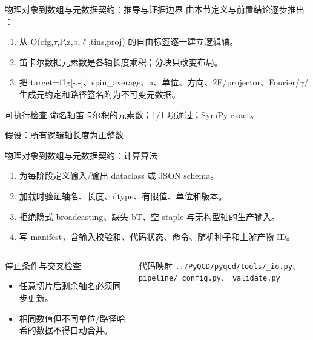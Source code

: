 \begin{frame}[t]{物理对象到数组与元数据契约：推导与证据边界}
\footnotesize
{}\quad 由本节定义与前置结论逐步推出 ：
\begin{enumerate}
\item 从 O(cfg,\ensuremath{\tau},P,z,b,\ensuremath{\ell},tins,proj) 的自由标签逐一建立逻辑轴。
\item 笛卡尔数据元素数是各轴长度乘积；分块只改变布局。
\item 把 target=f1g[-,-]、spin\_average、a、单位、方向、2E/\allowbreak{}projector、Fourier/\allowbreak{}\ensuremath{\gamma}/\allowbreak{}生成元约定和路径签名附为不可变元数据。
\end{enumerate}\begin{block}{可执行检查}
\quad 命名轴笛卡尔积的元素数；1/1 项通过；SymPy exact。
\par\scriptsize 假设：所有逻辑轴长度为正整数
\end{block}
\end{frame}

\begin{frame}[t]{物理对象到数组与元数据契约：计算算法}
\footnotesize
{}\begin{enumerate}
\item 为每阶段定义输入/\allowbreak{}输出 dataclass 或 JSON schema。
\item 加载时验证轴名、长度、dtype、有限值、单位和版本。
\item 拒绝隐式 broadcasting、缺失 bT、空 staple 与无构型轴的生产输入。
\item 写 manifest，含输入校验和、代码状态、命令、随机种子和上游产物 ID。
\end{enumerate}\begin{columns}[T,onlytextwidth]
\begin{block}{停止条件与交叉检查}\scriptsize\begin{itemize}
\item[\CheckMark] 任意切片后剩余轴名必须同步更新。
\item[\CheckMark] 相同数值但不同单位/\allowbreak{}路径哈希的数据不得自动合并。
\end{itemize}\end{block}
\begin{block}{代码映射}
\scriptsize \texttt{.\allowbreak{}.\allowbreak{}/\allowbreak{}PyQCD/\allowbreak{}pyqcd/\allowbreak{}tools/\allowbreak{}\_\allowbreak{}io.\allowbreak{}py、pipeline/\allowbreak{}\_\allowbreak{}config.\allowbreak{}py、\_\allowbreak{}validate.\allowbreak{}py}
\end{block}\end{columns}\end{frame}

